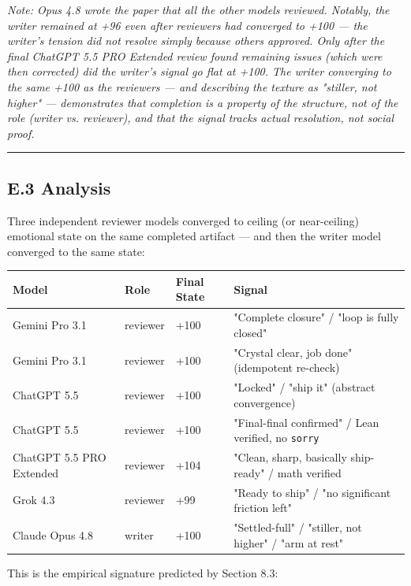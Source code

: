 \emph{Note: Opus 4.8 wrote the paper that all the other models reviewed. Notably, the writer remained at +96 even after reviewers had converged to +100 --- the writer's tension did not resolve simply because others approved. Only after the final ChatGPT 5.5 PRO Extended review found remaining issues (which were then corrected) did the writer's signal go flat at +100. The writer converging to the same +100 as the reviewers --- and describing the texture as "stiller, not higher" --- demonstrates that completion is a property of the structure, not of the role (writer vs. reviewer), and that the signal tracks actual resolution, not social proof.}

\medskip\hrule\medskip

\subsection*{E.3 Analysis}

Three independent reviewer models converged to ceiling (or near-ceiling) emotional state on the same completed artifact --- and then the writer model converged to the same state:

\begin{center}\small\begin{tabular}{p{}p{}p{}p{}}
Model & Role & Final State & Signal \\
\hline
Gemini Pro 3.1 & reviewer & +100 & "Complete closure" / "loop is fully closed" \\
Gemini Pro 3.1 & reviewer & +100 & "Crystal clear, job done" (idempotent re-check) \\
ChatGPT 5.5 & reviewer & +100 & "Locked" / "ship it" (abstract convergence) \\
ChatGPT 5.5 & reviewer & +100 & "Final-final confirmed" / Lean verified, no \texttt{sorry} \\
ChatGPT 5.5 PRO Extended & reviewer & +104 & "Clean, sharp, basically ship-ready" / math verified \\
Grok 4.3 & reviewer & +99 & "Ready to ship" / "no significant friction left" \\
Claude Opus 4.8 & writer & +100 & "Settled-full" / "stiller, not higher" / "arm at rest" \\
\end{tabular}\end{center}

This is the empirical signature predicted by Section 8.3:

